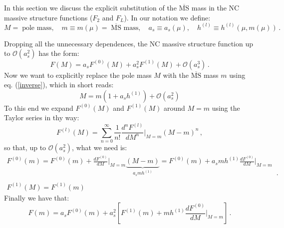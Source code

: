 \documentclass[10pt,a4paper]{article}
\begin{document}
In this section we discuss the explicit substitution of the $\overline{\mbox{MS}}$ mass in the NC massive structure functions ($F_2$ and $F_L$). In our notation we define:
\begin{equation}
M =\;\mbox{pole mass},\quad m\equiv m(\mu) =\;\overline{\mbox{MS}}\mbox{ mass},\quad a_s\equiv a_s(\mu),\quad h^{(l)}\equiv h^{(l)}(\mu,m(\mu))\,.
\end{equation}

Dropping all the unnecessary dependences, the NC massive structure function up to $\mathcal{O}(a_s^2)$ has the form:
\begin{equation}
F(M) = a_sF^{(0)}(M) + a_s^2F^{(1)}(M) + \mathcal{O}(a_s^3)\,.
\end{equation}
Now we want to explicitly replace the pole mass $M$ with the $\overline{\mbox{MS}}$ mass $m$ using eq. (\ref{inverse}), which in short reads:
\begin{equation}
M = m(1 + a_sh^{(1)}) + \mathcal{O}(a_s^2)
\end{equation}
To this end we expand $F^{(0)}(M)$ and $F^{(1)}(M)$ around $M=m$ using the Taylor series in thy way:
\begin{equation}
F^{(l)}(M) = \sum_{n=0}^{\infty}\frac1{n!}\frac{d^n F^{(l)}}{dM^n}\bigg|_{M=m}(M-m)^n\,,
\end{equation}
so that, up to $\mathcal{O}(a_s^2)$, what we need is:
\begin{equation}
\begin{array}{l}
\displaystyle F^{(0)}(m) = F^{(0)}(m) + \frac{dF^{(0)}}{dM}\bigg|_{M=m}\underbrace{(M-m)}_{a_smh^{(1)}} = F^{(0)}(m) + a_smh^{(1)}\frac{dF^{(0)}}{dM}\bigg|_{M=m}\\
\\
\displaystyle F^{(1)}(M) = F^{(1)}(m)
\end{array}\,.
\end{equation}
Finally we have that:
\begin{equation}\label{changescheme}
F(m) = a_sF^{(0)}(m) + a_s^2\left[F^{(1)}(m)+mh^{(1)}\frac{dF^{(0)}}{dM}\bigg|_{M=m}\right]\,.
\end{equation}
\end{document}
